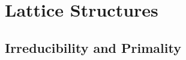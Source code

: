 \documentclass{book}
\begin{document}
	
	
	
	
	
	
	
	
	
	
	
	
	
	
	
	
	
	
	
	
	
	
	
	
	
	
	
	
	
	
	
	
	
	
	
	
	
	
	
	
	
	
	
	
	
	
	
	
	
	
	
	
	
	
	
	
	
	
	
	
	
	
	
	
	
	\newpage
	
	\section{Lattice Structures}
	
	\subsection{Irreducibility and Primality}
	
\end{document}
